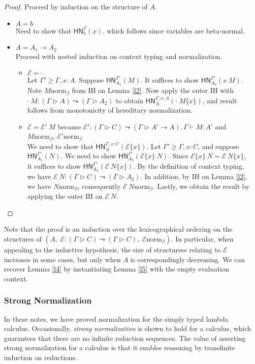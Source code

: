\documentclass{article}
\newcommand{\hasEF}[3]{\ensuremath{#1 \vdash #2 : #3}}
\newcommand{\hasC}[5]{\ensuremath{#1 : (#2 \rhd #3) \leadsto (#4 \rhd #5)}}
\newcommand{\bnorm}[1]{\ensuremath{#1 \mathrel{\text{norm}_\beta}}}
\newcommand{\hnorm}[3]{\ensuremath{\mathsf{HN}^{#1}_{#2}(#3)}}
\newcommand{\fillin}[2]{\ensuremath{#1\{#2\}}}
\newcommand{\fn}[2]{\ensuremath{#1 \to #2}}
\newcommand{\ap}[2]{\ensuremath{#1\ #2}}
\newcommand{\E}{\mathcal{E}}
\begin{document}
\begin{proof}
Proceed by induction on the structure of $A$.
\begin{itemize}
  \setlength\itemsep{1em}
  \item $A = b$\\
  Need to show that \hnorm{\Gamma}{b}{x}, which follows since variables are beta-normal.
  \item $A = \fn{A_1}{A_2}$\\
  Proceed with nested induction on context typing and normalization.
  \begin{itemize}
  \setlength\itemsep{1em}
  \item $\E = \cdot$\\
  Let $\Gamma' \ge \Gamma,x:A$. Suppose \hnorm{\Gamma'}{A_1}{M}. It suffices to show \hnorm{\Gamma'}{A_2}{\ap{x}{M}}. 
  Note \bnorm{M} from IH on Lemma \ref{l2}.
  Now apply the outer IH with $\hasC{\ap{\cdot}{M}}{\Gamma}{A}{\Gamma}{A_2}$ to obtain 
  \hnorm{\Gamma,x:A}{A}{\fillin{\ap{\cdot}{M}}{x}}, and result follows from monotonicity of hereditary normalization.
  \item $\E = \ap{\E'}{M}$ because $\hasC{\E'}{\Gamma}{C}{\Gamma}{\fn{A'}{A}}, \hasEF{\Gamma}{M}{A'}$ and 
  \bnorm{M}, \bnorm{\E'}\\
  We need to show that \hnorm{\Gamma,x:C}{A}{\fillin{\E}{x}}. Let $\Gamma' \ge \Gamma,x:C$, and 
  suppose \hnorm{\Gamma'}{A_1}{N}. We need to show \hnorm{\Gamma'}{A_2}{\ap{\fillin{\E}{x}}{N}}. Since
  $\ap{\fillin{\E}{x}}{N} = \fillin{\ap{\E}{N}}{x}$, it suffices to show \hnorm{\Gamma'}{A_2}{\fillin{\ap{\E}{N}}{x}}.
  By the definition of context typing, we have \hasC{\ap{\E}{N}}{\Gamma}{C}{\Gamma}{A_2}. In addition, 
  by IH on Lemma \ref{l2}, we have $\bnorm{N}$, consequently $\bnorm{\ap{\E}{N}}$. Lastly, we obtain the result by applying the outer IH on $\ap{\E}{N}$.
  \end{itemize}
\end{itemize}
\end{proof}

Note that the proof is an induction over the lexicographical ordering on the structures of 
$(A,\; \hasC{\E}{\Gamma}{C}{\Gamma}{C},\; \bnorm{\E})$. In particular, when appealing to the inductive hypothesis,
the size of structurese relating to $\E$ increases in some cases, but only when $A$ is correspondingly decreasing. We can recover Lemma \ref{l4} by instantiating Lemma \ref{l5} with the empty evaluation context.

\subsubsection{Strong Normalization}

In these notes, we have proved normalization for the simply typed lambda calculus.
Occasionally, \emph{strong normalization} is shown to hold for a calculus, which guarantees
that there are no infinite reduction sequences.  The value of asserting strong normalization
for a calculus is that it enables reasoning by transfinite induction on reductions.



\end{document}
